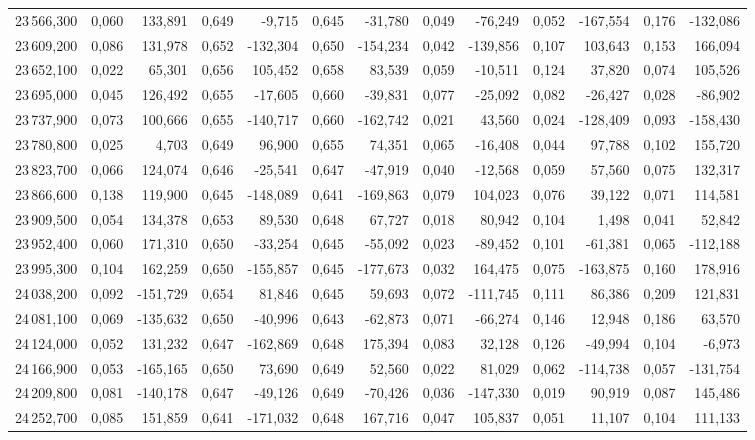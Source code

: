 \begin{longtable}{rrrrrrrrrrrrr}
23\,566,300 & 0,060 & 133,891 & 0,649 & -9,715 & 0,645 & -31,780 & 0,049 & -76,249 & 0,052 & -167,554 & 0,176 & -132,086\\
23\,609,200 & 0,086 & 131,978 & 0,652 & -132,304 & 0,650 & -154,234 & 0,042 & -139,856 & 0,107 & 103,643 & 0,153 & 166,094\\
23\,652,100 & 0,022 & 65,301 & 0,656 & 105,452 & 0,658 & 83,539 & 0,059 & -10,511 & 0,124 & 37,820 & 0,074 & 105,526\\
23\,695,000 & 0,045 & 126,492 & 0,655 & -17,605 & 0,660 & -39,831 & 0,077 & -25,092 & 0,082 & -26,427 & 0,028 & -86,902\\
23\,737,900 & 0,073 & 100,666 & 0,655 & -140,717 & 0,660 & -162,742 & 0,021 & 43,560 & 0,024 & -128,409 & 0,093 & -158,430\\
23\,780,800 & 0,025 & 4,703 & 0,649 & 96,900 & 0,655 & 74,351 & 0,065 & -16,408 & 0,044 & 97,788 & 0,102 & 155,720\\
23\,823,700 & 0,066 & 124,074 & 0,646 & -25,541 & 0,647 & -47,919 & 0,040 & -12,568 & 0,059 & 57,560 & 0,075 & 132,317\\
23\,866,600 & 0,138 & 119,900 & 0,645 & -148,089 & 0,641 & -169,863 & 0,079 & 104,023 & 0,076 & 39,122 & 0,071 & 114,581\\
23\,909,500 & 0,054 & 134,378 & 0,653 & 89,530 & 0,648 & 67,727 & 0,018 & 80,942 & 0,104 & 1,498 & 0,041 & 52,842\\
23\,952,400 & 0,060 & 171,310 & 0,650 & -33,254 & 0,645 & -55,092 & 0,023 & -89,452 & 0,101 & -61,381 & 0,065 & -112,188\\
23\,995,300 & 0,104 & 162,259 & 0,650 & -155,857 & 0,645 & -177,673 & 0,032 & 164,475 & 0,075 & -163,875 & 0,160 & 178,916\\
24\,038,200 & 0,092 & -151,729 & 0,654 & 81,846 & 0,645 & 59,693 & 0,072 & -111,745 & 0,111 & 86,386 & 0,209 & 121,831\\
24\,081,100 & 0,069 & -135,632 & 0,650 & -40,996 & 0,643 & -62,873 & 0,071 & -66,274 & 0,146 & 12,948 & 0,186 & 63,570\\
24\,124,000 & 0,052 & 131,232 & 0,647 & -162,869 & 0,648 & 175,394 & 0,083 & 32,128 & 0,126 & -49,994 & 0,104 & -6,973\\
24\,166,900 & 0,053 & -165,165 & 0,650 & 73,690 & 0,649 & 52,560 & 0,022 & 81,029 & 0,062 & -114,738 & 0,057 & -131,754\\
24\,209,800 & 0,081 & -140,178 & 0,647 & -49,126 & 0,649 & -70,426 & 0,036 & -147,330 & 0,019 & 90,919 & 0,087 & 145,486\\
24\,252,700 & 0,085 & 151,859 & 0,641 & -171,032 & 0,648 & 167,716 & 0,047 & 105,837 & 0,051 & 11,107 & 0,104 & 111,133\\

\end{longtable}
